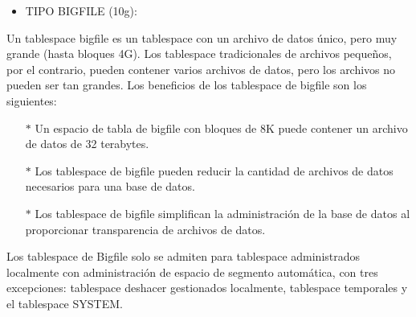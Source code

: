 \begin{itemize}
	\item TIPO BIGFILE (10g):
\end{itemize}
\begin{adjustwidth}{0.40in}{0.0in}
	Un tablespace bigfile es un tablespace con un archivo de datos único, pero muy grande (hasta bloques 4G). Los tablespace tradicionales de archivos pequeños, por el contrario, pueden contener varios archivos de datos, pero los archivos no pueden ser tan grandes. Los beneficios de los tablespace de bigfile son los siguientes:
	\begin{itemize}
		\item[$*$] Un espacio de tabla de bigfile con bloques de 8K puede contener un archivo de datos de 32 terabytes. 
		\item[$*$] Los tablespace de bigfile pueden reducir la cantidad de archivos de datos necesarios para una base de datos. 
		\item[$*$] Los tablespace de bigfile simplifican la administración de la base de datos al proporcionar transparencia de archivos de datos. \\
	\end{itemize}
	Los tablespace de Bigfile solo se admiten para tablespace administrados localmente con administración de espacio de segmento automática, con tres excepciones: tablespace deshacer gestionados localmente, tablespace temporales y el tablespace SYSTEM.		
\end{adjustwidth}

